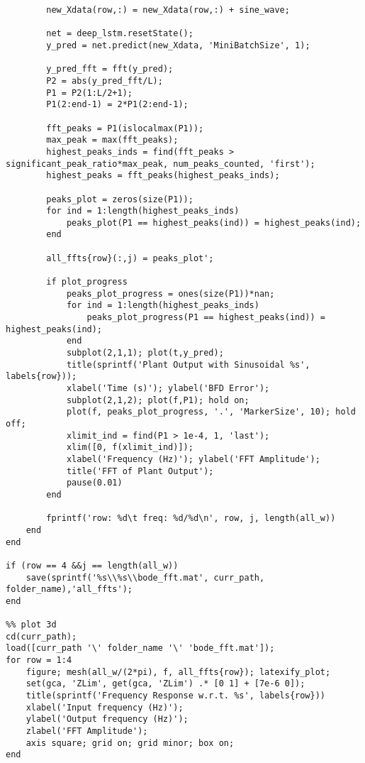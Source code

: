 \begin{lstlisting}
        new_Xdata(row,:) = new_Xdata(row,:) + sine_wave;
        
        net = deep_lstm.resetState();
        y_pred = net.predict(new_Xdata, 'MiniBatchSize', 1);

        y_pred_fft = fft(y_pred);
        P2 = abs(y_pred_fft/L);
        P1 = P2(1:L/2+1);
        P1(2:end-1) = 2*P1(2:end-1);

        fft_peaks = P1(islocalmax(P1));
        max_peak = max(fft_peaks);
        highest_peaks_inds = find(fft_peaks > significant_peak_ratio*max_peak, num_peaks_counted, 'first');
        highest_peaks = fft_peaks(highest_peaks_inds);

        peaks_plot = zeros(size(P1));
        for ind = 1:length(highest_peaks_inds)
            peaks_plot(P1 == highest_peaks(ind)) = highest_peaks(ind);
        end

        all_ffts{row}(:,j) = peaks_plot';

        if plot_progress
            peaks_plot_progress = ones(size(P1))*nan;
            for ind = 1:length(highest_peaks_inds)
                peaks_plot_progress(P1 == highest_peaks(ind)) = highest_peaks(ind);
            end
            subplot(2,1,1); plot(t,y_pred);
            title(sprintf('Plant Output with Sinusoidal %s', labels{row}));
            xlabel('Time (s)'); ylabel('BFD Error');
            subplot(2,1,2); plot(f,P1); hold on;
            plot(f, peaks_plot_progress, '.', 'MarkerSize', 10); hold off;
            xlimit_ind = find(P1 > 1e-4, 1, 'last');
            xlim([0, f(xlimit_ind)]);
            xlabel('Frequency (Hz)'); ylabel('FFT Amplitude');
            title('FFT of Plant Output');
            pause(0.01)
        end

        fprintf('row: %d\t freq: %d/%d\n', row, j, length(all_w))
    end
end

if (row == 4 &&j == length(all_w))
    save(sprintf('%s\\%s\\bode_fft.mat', curr_path, folder_name),'all_ffts');
end

%% plot 3d
cd(curr_path);
load([curr_path '\' folder_name '\' 'bode_fft.mat']);
for row = 1:4
    figure; mesh(all_w/(2*pi), f, all_ffts{row}); latexify_plot;
    set(gca, 'ZLim', get(gca, 'ZLim') .* [0 1] + [7e-6 0]);
    title(sprintf('Frequency Response w.r.t. %s', labels{row}))
    xlabel('Input frequency (Hz)');
    ylabel('Output frequency (Hz)');
    zlabel('FFT Amplitude');
    axis square; grid on; grid minor; box on;
end
\end{lstlisting}

